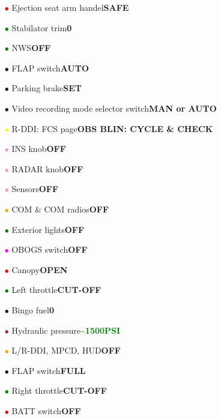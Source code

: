 \documentclass[a4paper,12pt,dvipsnames]{letter}
\newcommand{\button}[1]{\textbf{#1}}
\newcommand{\ok}[1]{\textcolor{Green}{\textbf{#1}}}
\newcommand{\myHead}[1]{{\LARGE\textsc{\textbf{#1}}}}
\newcommand{\bi}{\textcolor{ProcessBlue}{$\bullet$\;}}
\newcommand{\ri}{\textcolor{Red}{$\bullet$\;}}
\newcommand{\gi}{\textcolor{Green}{$\bullet$\;}}
\newcommand{\yi}{\textcolor{Yellow}{$\bullet$\;}}
\newcommand{\vi}{\textcolor{Plum}{$\bullet$\;}}
\newcommand{\mi}{\textcolor{Magenta}{$\bullet$\;}}
\newcommand{\oi}{\textcolor{Orange}{$\bullet$\;}}
\renewcommand{\ni}{\textcolor{Brown}{$\bullet$\;}}
\begin{document}
{\begin{itemize}
 \item[\ri] Ejection seat arm handel\dotfill\button{SAFE}
 \item[\gi] Stabilator trim\dotfill\button{0\textdegree}
 \item[\gi] NWS\dotfill\button{OFF} 
 \item[\bi] FLAP switch\dotfill\button{AUTO}
 \item[\bi] Parking brake\dotfill\button{SET}
 \item[\bi] Video recording mode selector switch\dotfill\button{MAN or AUTO}
 \item[\yi] R-DDI: FCS page\dotfill\button{OBS BLIN: CYCLE \& CHECK}
 \item[\vi] INS knob\dotfill\button{OFF}
 \item[\vi] RADAR knob\dotfill\button{OFF}
 \item[\vi] Sensors\dotfill\button{OFF}
 \item[\oi] COM \& COM radios\dotfill\button{OFF}
 \item[\gi] Exterior lights\dotfill\button{OFF}
 \item[\mi] OBOGS switch\dotfill\button{OFF}
 \item[\ri] Canopy\dotfill\button{OPEN}
 \item[\gi] Left throttle\dotfill\button{CUT-OFF}
 \item[\bi] Bingo fuel\dotfill\button{0}
 \item[\ni] Hydraulic pressure\dotfill\ok{\textasciitilde 1500\;PSI}
 \item[\oi] L/R-DDI, MPCD, HUD\dotfill\button{OFF}
 \item[\bi] FLAP switch\dotfill\button{FULL}
 \item[\gi] Right throttle\dotfill\button{CUT-OFF}
 \item[\ri] BATT switch\dotfill\button{OFF}
\end{itemize}
%
}
\end{document}
